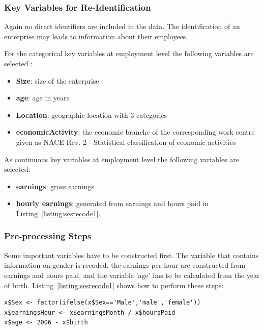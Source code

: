\documentclass[12pt]{article}
\begin{document}
\subsubsection{Key Variables for Re-Identification} \label{suub:keys}

Again no direct identifiers are included in the data. 
The identification of an enterprise may leads to information about their employees.

For the categorical key variables at employment level the following variables are selected \citep[see also][]{ichim07}: 
\begin{itemize}
	\item {\bf Size}: size of the enterprise
	\item {\bf age}: age in years
	\item {\bf Location}: geographic location with 3 categories
	\item {\bf economicActivity}: the economic branche of the corresponding work centre given as NACE Rev. 2 - 
	Statistical classification of economic activities
\end{itemize} 

    
As continuous key variables at employment level the following variables are selected:
\begin{itemize}
	\item {\bf earnings}: 
gross earnings 
   \item {\bf hourly earnings}: generated from earnings and hours paid in Listing~\ref{listing:sesrecode1}.
\end{itemize}


\subsubsection{Pre-processing Steps}

Some important variables have to be constructed first. The variable that contains information on gender is recoded, the earnings per hour are constructed from earnings and hours paid, and the variable 'age' has to be calculated from the year of birth. Listing~\ref{listing:sesrecode1} shows how to perform these steps:

\begin{lstlisting}[numbers=none,captionpos=b, caption={Pre-processing of the SES data to generate new variables.}, label=listing:sesrecode1]
x$Sex <- factor(ifelse(x$Sex=='Male','male','female'))
x$earningsHour <- x$earningsMonth / x$hoursPaid
x$age <- 2006 - x$birth
\end{lstlisting}
\end{document}
